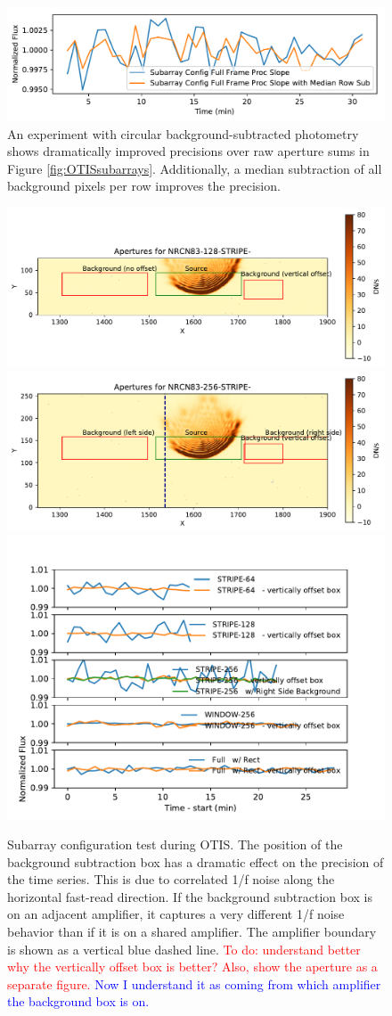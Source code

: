 \documentclass{aastex62}
\begin{document}
\begin{figure}[!hbtp]
\centering
\includegraphics[width=.5\columnwidth]{fullframe_background_sub_compare_tser_tools.pdf}
\caption{An experiment with circular background-subtracted photometry shows dramatically improved precisions over raw aperture sums in Figure \ref{fig:OTISsubarrays}.
Additionally, a median subtraction of all background pixels per row improves the precision.}\label{fig:OTISSubConfigCircularAp}
\end{figure}

\begin{figure}[!hbtp]
\centering
\includegraphics[width=0.48\columnwidth]{apertures_for_NRCN83-128-STRIPE-72.pdf}
\includegraphics[width=0.48\columnwidth]{apertures_for_NRCN83-256-STRIPE-72.pdf}
\includegraphics[width=.48\columnwidth]{subarray_config_tser_backsub_rect.pdf}
\caption{Subarray configuration test during OTIS. The position of the background subtraction box has a dramatic effect on the precision of the time series.
This is due to correlated 1/f noise along the horizontal fast-read direction.
If the background subtraction box is on an adjacent amplifier, it captures a very different 1/f noise behavior than if it is on a shared amplifier.
The amplifier boundary is shown as a vertical blue dashed line.
\textcolor{red}{To do: understand better why the vertically offset box is better? Also, show the aperture as a separate figure.}
\textcolor{blue}{Now I understand it as coming from which amplifier the background box is on.}}\label{fig:OTISRectBacksub}
\end{figure}
\end{document}
